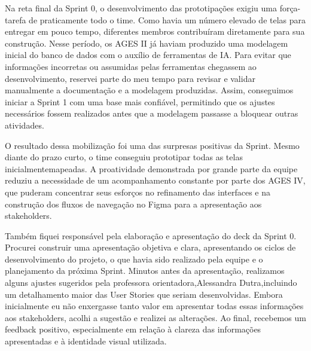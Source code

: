 
\indent Na reta final da Sprint 0, o desenvolvimento das prototipações exigiu uma força-tarefa de praticamente todo o time. Como havia um número elevado de telas para entregar em pouco tempo, diferentes membros contribuíram diretamente para sua construção. Nesse período, os AGES II já haviam produzido uma modelagem inicial do banco de dados com o auxílio de ferramentas de IA. Para evitar que informações incorretas ou assumidas pelas ferramentas chegassem ao desenvolvimento, reservei parte do meu tempo para revisar e validar manualmente a documentação e a modelagem produzidas. Assim, conseguimos iniciar a Sprint 1 com uma base mais confiável, permitindo que os ajustes necessários fossem realizados antes que a modelagem passasse a bloquear outras atividades.\par

\indent O resultado dessa mobilização foi uma das surpresas positivas da Sprint. Mesmo diante do prazo curto, o time conseguiu prototipar todas as telas inicialmente\originalspace{}mapeadas. A proatividade demonstrada por grande parte da equipe reduziu a necessidade de um acompanhamento constante por parte dos AGES IV, que puderam concentrar seus esforços no refinamento das interfaces e na construção dos fluxos de navegação no Figma para a apresentação aos stakeholders.\par

\indent Também fiquei responsável pela elaboração e apresentação do deck da Sprint 0. Procurei construir uma apresentação objetiva e clara, apresentando os ciclos de desenvolvimento do projeto, o que havia sido realizado pela equipe e o planejamento da próxima Sprint. Minutos antes da apresentação, realizamos alguns ajustes sugeridos pela professora orientadora,\originalspace{}Alessandra Dutra,\originalspace{}incluindo um detalhamento maior das User Stories que seriam desenvolvidas. Embora inicialmente eu não enxergasse tanto valor em apresentar todas essas informações aos stakeholders, acolhi a sugestão e realizei as alterações. Ao final, recebemos um feedback positivo, especialmente em relação à clareza das informações apresentadas e à identidade visual utilizada.\par

